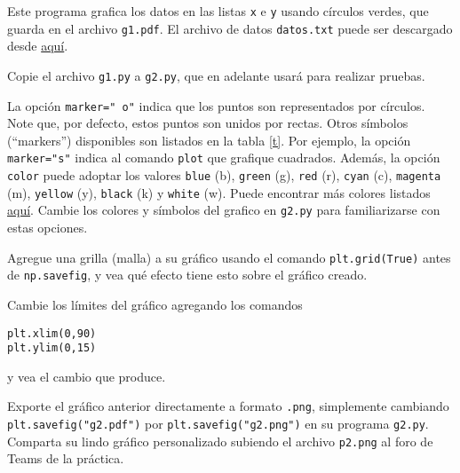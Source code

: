 \documentclass[11pt]{exam}
\begin{document}
\begin{questions}
Este programa grafica los datos en las listas \texttt{x} e \texttt{y} usando círculos verdes, que guarda en el archivo \texttt{g1.pdf}. El archivo de datos \texttt{datos.txt} puede ser descargado desde \href{https://udec.instructure.com/courses/51022/pages/numpy?module_item_id=1904641}{aquí}.

\item Copie el archivo \texttt{g1.py} a \texttt{g2.py}, que en adelante usará para realizar pruebas. 
\item La opción \texttt{marker="\,o"} indica que los puntos son representados por círculos. Note que, por defecto, estos puntos son unidos por rectas. Otros símbolos (``markers'') disponibles son listados en la tabla \ref{t}. Por ejemplo, la opción \texttt{marker="s"} indica al comando \texttt{plot} que grafique cuadrados. 
Además, la opción \texttt{color} puede adoptar los valores \texttt{blue} (b), \texttt{green} (g), \texttt{red} (r), \texttt{cyan} (c), \texttt{magenta} (m), \texttt{yellow} (y), \texttt{black} (k) y \texttt{white} (w). Puede encontrar más colores listados \href{http://matplotlib.org/examples/color/named_colors.html}{aquí}. Cambie los colores y símbolos del grafico en \texttt{g2.py} para familiarizarse con estas opciones.

\item Agregue una grilla (malla) a su gráfico usando el comando \texttt{plt.grid(True)} antes de \texttt{np.savefig}, y vea qué efecto tiene esto sobre el gráfico creado.
\item Cambie los límites del gráfico agregando los comandos

\begin{verbatim}
plt.xlim(0,90)
plt.ylim(0,15)
\end{verbatim}
y vea el cambio que produce.


\item Exporte el gráfico anterior directamente a formato \texttt{.png}, simplemente cambiando \newline \texttt{plt.savefig("g2.pdf")} por \texttt{plt.savefig("g2.png")} en su programa \texttt{g2.py}. Comparta su lindo gráfico personalizado subiendo el archivo \texttt{p2.png} al foro de Teams de la práctica.


\end{questions}
\end{document}
